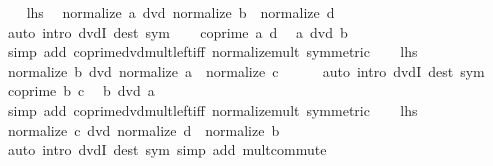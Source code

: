 \begin{isabellebody}
\ \ \isamarkupfalse%
\ {\isacartoucheopen}{\isacharquery}{\kern0pt}lhs{\isacartoucheclose}\ \isamarkupfalse%
\ {\isachardoublequoteopen}normalize\ a\ dvd\ normalize\ b\ {\isacharasterisk}{\kern0pt}\ normalize\ d{\isachardoublequoteclose}\isanewline
\ \ \ \ \isamarkupfalse%
\ {\isacharparenleft}{\kern0pt}auto\ intro{\isacharcolon}{\kern0pt}\ dvdI\ dest{\isacharcolon}{\kern0pt}\ sym{\isacharparenright}{\kern0pt}\isanewline
\ \ \isamarkupfalse%
\ {\isacartoucheopen}coprime\ a\ d{\isacartoucheclose}\ \isamarkupfalse%
\ {\isachardoublequoteopen}a\ dvd\ b{\isachardoublequoteclose}\isanewline
\ \ \ \ \isamarkupfalse%
\ {\isacharparenleft}{\kern0pt}simp\ add{\isacharcolon}{\kern0pt}\ coprime{\isacharunderscore}{\kern0pt}dvd{\isacharunderscore}{\kern0pt}mult{\isacharunderscore}{\kern0pt}left{\isacharunderscore}{\kern0pt}iff\ normalize{\isacharunderscore}{\kern0pt}mult\ {\isacharbrackleft}{\kern0pt}symmetric{\isacharbrackright}{\kern0pt}{\isacharparenright}{\kern0pt}\isanewline
\ \ \isamarkupfalse%
\ {\isacartoucheopen}{\isacharquery}{\kern0pt}lhs{\isacartoucheclose}\ \isamarkupfalse%
\ {\isachardoublequoteopen}normalize\ b\ dvd\ normalize\ a\ {\isacharasterisk}{\kern0pt}\ normalize\ c{\isachardoublequoteclose}\isanewline
\ \ \ \ \isamarkupfalse%
\ {\isacharparenleft}{\kern0pt}auto\ intro{\isacharcolon}{\kern0pt}\ dvdI\ dest{\isacharcolon}{\kern0pt}\ sym{\isacharparenright}{\kern0pt}\isanewline
\ \ \isamarkupfalse%
\ {\isacartoucheopen}coprime\ b\ c{\isacartoucheclose}\ \isamarkupfalse%
\ {\isachardoublequoteopen}b\ dvd\ a{\isachardoublequoteclose}\isanewline
\ \ \ \ \isamarkupfalse%
\ {\isacharparenleft}{\kern0pt}simp\ add{\isacharcolon}{\kern0pt}\ coprime{\isacharunderscore}{\kern0pt}dvd{\isacharunderscore}{\kern0pt}mult{\isacharunderscore}{\kern0pt}left{\isacharunderscore}{\kern0pt}iff\ normalize{\isacharunderscore}{\kern0pt}mult\ {\isacharbrackleft}{\kern0pt}symmetric{\isacharbrackright}{\kern0pt}{\isacharparenright}{\kern0pt}\isanewline
\ \ \isamarkupfalse%
\ {\isacartoucheopen}{\isacharquery}{\kern0pt}lhs{\isacartoucheclose}\ \isamarkupfalse%
\ {\isachardoublequoteopen}normalize\ c\ dvd\ normalize\ d\ {\isacharasterisk}{\kern0pt}\ normalize\ b{\isachardoublequoteclose}\isanewline
\ \ \ \ \isamarkupfalse%
\ {\isacharparenleft}{\kern0pt}auto\ intro{\isacharcolon}{\kern0pt}\ dvdI\ dest{\isacharcolon}{\kern0pt}\ sym\ simp\ add{\isacharcolon}{\kern0pt}\ mult{\isachardot}{\kern0pt}commute{\isacharparenright}{\kern0pt}\isanewline

\end{isabellebody}

